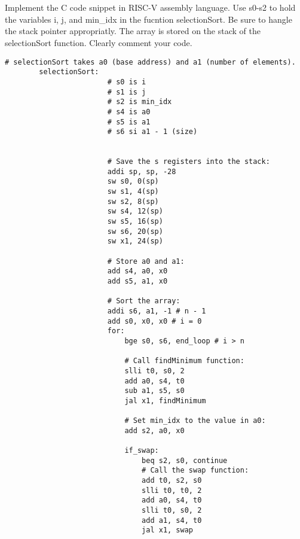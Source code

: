 \documentclass[12pt]{article}
\begin{document}
    \section{}
    \begin{flushleft}
        Implement the C code snippet in RISC-V assembly language. Use s0-s2 to hold the variables
        i, j, and min_idx in the fucntion selectionSort. Be sure to hangle the stack pointer
        appropriatly. The array is stored on the stack of the selectionSort function. Clearly 
        comment your code.
    \end{flushleft}
    \begin{lstlisting}[language=RISCV]
        # selectionSort takes a0 (base address) and a1 (number of elements).
        selectionSort:
                        # s0 is i
                        # s1 is j
                        # s2 is min_idx
                        # s4 is a0
                        # s5 is a1
                        # s6 si a1 - 1 (size)
                        

                        # Save the s registers into the stack:
                        addi sp, sp, -28
                        sw s0, 0(sp)
                        sw s1, 4(sp)
                        sw s2, 8(sp)
                        sw s4, 12(sp)
                        sw s5, 16(sp)
                        sw s6, 20(sp)
                        sw x1, 24(sp)

                        # Store a0 and a1:
                        add s4, a0, x0
                        add s5, a1, x0
            
                        # Sort the array:
                        addi s6, a1, -1 # n - 1 
                        add s0, x0, x0 # i = 0
                        for:
                            bge s0, s6, end_loop # i > n

                            # Call findMinimum function:
                            slli t0, s0, 2
                            add a0, s4, t0
                            sub a1, s5, s0
                            jal x1, findMinimum

                            # Set min_idx to the value in a0:
                            add s2, a0, x0

                            if_swap:
                                beq s2, s0, continue
                                # Call the swap function:
                                add t0, s2, s0
                                slli t0, t0, 2
                                add a0, s4, t0
                                slli t0, s0, 2
                                add a1, s4, t0
                                jal x1, swap


\end{lstlisting}
\end{document}
